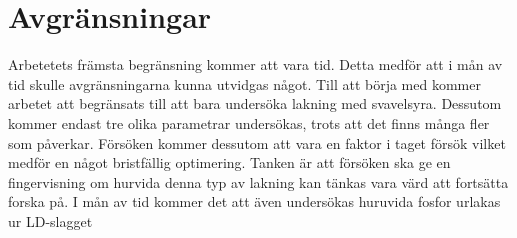\section{Avgränsningar}



Arbetetets främsta begränsning kommer att vara tid. Detta medför att i mån av tid skulle avgränsningarna kunna utvidgas något. Till att börja med kommer arbetet att  begränsats till att bara undersöka lakning med svavelsyra. Dessutom kommer endast tre olika parametrar undersökas, trots att det finns många fler som påverkar. Försöken kommer dessutom att vara en faktor i taget försök vilket medför en något bristfällig optimering. Tanken är att försöken ska ge en fingervisning om hurvida denna typ av lakning kan tänkas vara värd att fortsätta forska på. I mån av tid kommer det att även undersökas huruvida fosfor urlakas ur LD-slagget  

